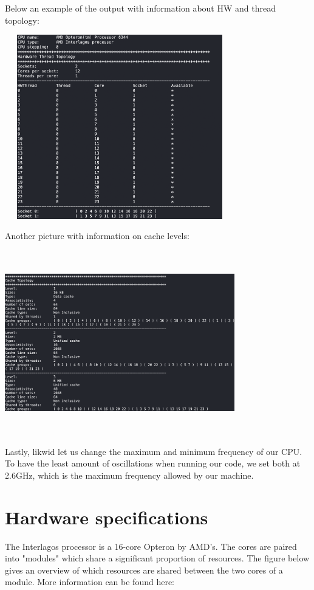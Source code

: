\documentclass[11pt,a4paper,oneside,titlepage,openright]{book}
\begin{document}
Below an example of the output with information about HW and thread topology:\\
\begin{center}
\includegraphics[width=10cm, height=8cm]{topology_1}
\end{center}
Another picture with information on cache levels:\\
\begin{center}
\includegraphics[width=10cm, height=8cm]{topology_2}
\end{center}

Lastly, likwid let us change the maximum and minimum frequency of our CPU. To have the least amount of oscillations when running our code, we set both at 2.6GHz, which is the maximum frequency allowed by our machine.

\section{Hardware specifications}
The Interlagos processor is a 16-core Opteron by AMD's. The cores are paired into "modules" which share a significant proportion of resources. The figure below gives an overview of which resources are shared between the two cores of a module. More information can be found here: \cite{interlagos}
\end{document}
